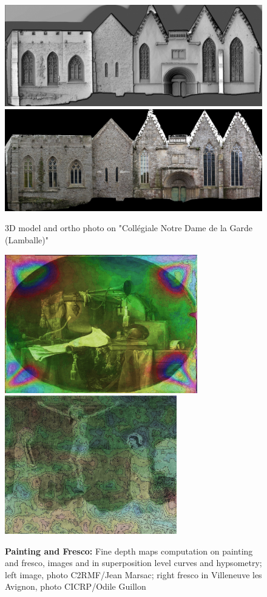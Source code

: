 \begin{figure}
\includegraphics[width=150mm]{FIGS/SAMPLES/LambaleShade.jpg}
\includegraphics[width=150mm]{FIGS/SAMPLES/Lamballe-Ortho-Test-Redr.jpg}
\caption{3D model and ortho photo on "Coll\'egiale Notre Dame de la Garde (Lamballe)"}
\end{figure}




\begin{figure}
\includegraphics[width=84mm]{FIGS/SAMPLES/Louvre-Superp.jpg}
\includegraphics[width=75mm]{FIGS/SAMPLES/FresqVilAv.jpg}
\caption{{\bf Painting and Fresco: } Fine depth maps computation on painting and fresco,
images and in superposition level curves and hypsometry;
left image, photo C2RMF/Jean Marsac; right fresco in Villeneuve
les Avignon, photo CICRP/Odile Guillon}
\end{figure}



